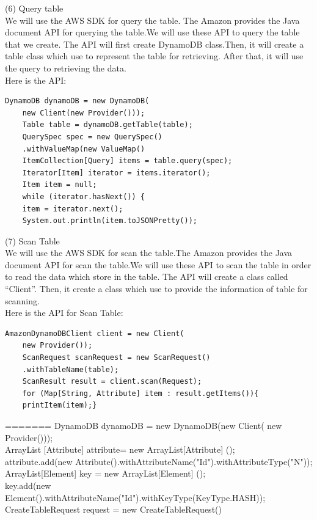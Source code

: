     (6) Query table \\
    We will use the AWS SDK for query the table. The Amazon provides the Java document API for querying the table.We will use these API to query the table that we create. The API will first create DynamoDB class.Then, it will create a table class which use to represent the table for retrieving. After that, it will use the query to retrieving the data.\\
    Here is the API\cite{w2}:
      \begin{lstlisting}[caption=API for query table]
    DynamoDB dynamoDB = new DynamoDB(
    new Client(new Provider()));
    Table table = dynamoDB.getTable(table);
    QuerySpec spec = new QuerySpec()
    .withValueMap(new ValueMap()
    ItemCollection[Query] items = table.query(spec);
    Iterator[Item] iterator = items.iterator();
    Item item = null;
    while (iterator.hasNext()) {
    item = iterator.next();
    System.out.println(item.toJSONPretty());
	\end{lstlisting}
    (7) Scan Table \\
    We will use the AWS SDK for scan the table.The Amazon provides the Java document API for scan the table.We will use these API to scan the table in order to read the data which store in the table. The API will create a class called “Client”. Then, it create a class which use to provide the information of table for scanning.\\
    Here is the API for Scan Table\cite{w3}:
      \begin{lstlisting}[caption=API for scan table]
    AmazonDynamoDBClient client = new Client(
    new Provider());
    ScanRequest scanRequest = new ScanRequest()
    .withTableName(table);
    ScanResult result = client.scan(Request);
    for (Map[String, Attribute] item : result.getItems()){
    printItem(item);}
    \end{lstlisting}
=======
    DynamoDB dynamoDB = new DynamoDB(new Client(
    new Provider()));\\
    ArrayList [Attribute] attribute= new ArrayList[Attribute] ();\\
    attribute.add(new Attribute().withAttributeName("Id").withAttributeType("N"));\\
    ArrayList[Element] key = new ArrayList[Element] ();\\
 key.add(new  Element().withAttributeName("Id").withKeyType(KeyType.HASH));\\
CreateTableRequest request = new CreateTableRequest()\\
